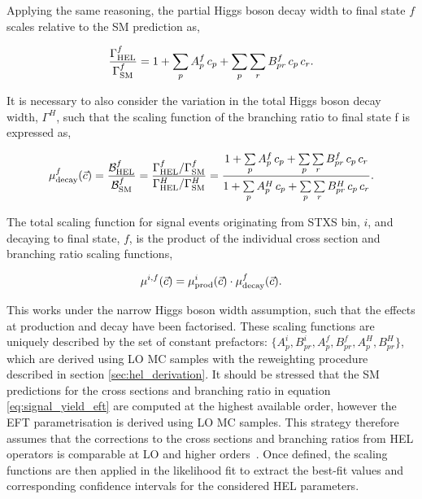 Applying the same reasoning, the partial Higgs boson decay width to final state $f$ scales relative to the SM prediction as,

\begin{equation}
    \frac{\Gamma^f_{\rm{HEL}}}{\Gamma^f_{\rm{SM}}} = 1 + \sum_p A^f_p\,c_p + \sum_p \sum_r B^f_{pr}\,c_p\,c_r.
\end{equation}

\noindent
It is necessary to also consider the variation in the total Higgs boson decay width, $\Gamma^H$, such that the scaling function of the branching ratio to final state f is expressed as,

\begin{equation}
    \mu^f_{\rm{decay}}(\vec{c}) = \frac{\mathcal{B}^f_{\rm{HEL}}}{\mathcal{B}^f_{\rm{SM}}} = \frac{\Gamma^f_{\rm{HEL}}/\Gamma^f_{\rm{SM}}}{\Gamma^H_{\rm{HEL}}/\Gamma^H_{\rm{SM}}} = \frac{1 + \sum\limits_p A^f_p\,c_p + \sum\limits_p \sum\limits_r B^f_{pr}\,c_p\,c_r}{1 + \sum\limits^{~}_p A^H_p\,c_p + \sum\limits_p \sum\limits_r B^H_{pr}\,c_p\,c_r}.
\end{equation}

The total scaling function for signal events originating from STXS bin, $i$, and decaying to final state, $f$, is the product of the individual cross section and branching ratio scaling functions,

\begin{equation}
    \mu^{i,f}(\vec{c}) = \mu^i_{\rm{prod}}(\vec{c}) \cdot \mu^f_{\rm{decay}}(\vec{c}).
\end{equation}

\noindent
This works under the narrow Higgs boson width assumption, such that the effects at production and decay have been factorised. These scaling functions are uniquely described by the set of constant prefactors: $\{A^i_p,B^i_{pr},A^f_p,B^f_{pr},A^{H}_p,B^{H}_{pr}\}$, which are derived using LO MC samples with the reweighting procedure described in section \ref{sec:hel_derivation}. It should be stressed that the SM predictions for the cross sections and branching ratio in equation \ref{eq:signal_yield_eft} are computed at the highest available order, however the EFT parametrisation is derived using LO MC samples. This strategy therefore assumes that the corrections to the cross sections and branching ratios from HEL operators is comparable at LO and higher orders~\cite{Degrande:2016dqg}. Once defined, the scaling functions are then applied in the likelihood fit to extract the best-fit values and corresponding confidence intervals for the considered HEL parameters. 


